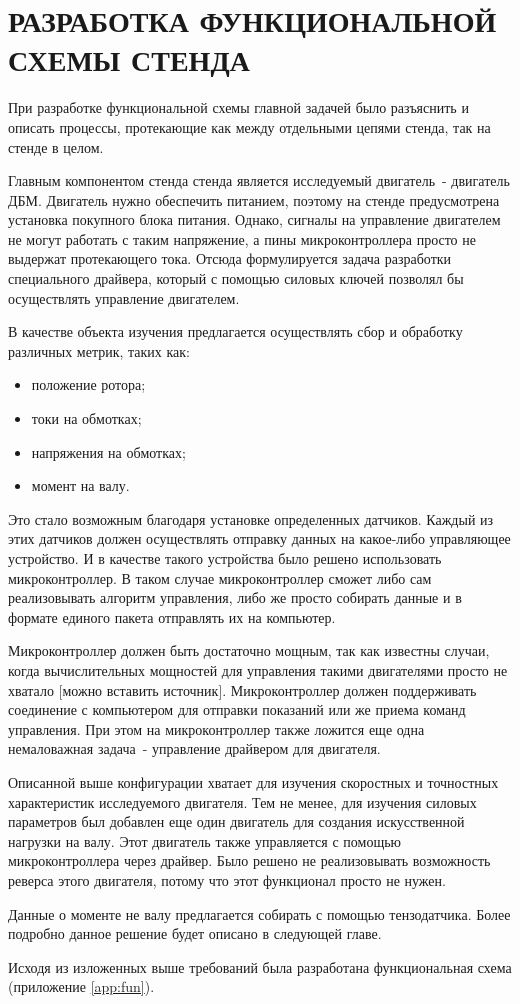 \section{РАЗРАБОТКА ФУНКЦИОНАЛЬНОЙ СХЕМЫ СТЕНДА}

При разработке функциональной схемы главной задачей было разъяснить и описать
процессы, протекающие как между отдельными цепями стенда, так на стенде в целом.

Главным компонентом стенда стенда является исследуемый двигатель~- двигатель ДБМ. Двигатель нужно
обеспечить питанием, поэтому на стенде предусмотрена установка покупного блока питания.
Однако, сигналы на управление двигателем не могут работать с таким напряжение, а
пины микроконтроллера просто не выдержат протекающего тока. Отсюда формулируется
задача разработки специального драйвера, который с помощью силовых ключей позволял бы
осуществлять управление двигателем.

В качестве объекта изучения предлагается осуществлять сбор и обработку различных метрик, таких как:
\begin{itemize}
  \item положение ротора;
  \item токи на обмотках;
  \item напряжения на обмотках;
  \item момент на валу.
\end{itemize}

Это стало возможным благодаря установке определенных датчиков. Каждый из этих датчиков
должен осуществлять отправку данных на какое-либо управляющее устройство. И в качестве такого
устройства было решено использовать микроконтроллер. В таком случае микроконтроллер сможет
либо сам реализовывать алгоритм управления, либо же просто собирать данные и в формате 
единого пакета отправлять их на компьютер.

Микроконтроллер должен быть достаточно мощным, так как известны случаи, когда вычислительных
мощностей для управления такими двигателями просто не хватало [можно вставить источник]. 
Микроконтроллер должен поддерживать соединение с компьютером для отправки показаний или же
приема команд управления.
При этом на микроконтроллер также ложится еще одна немаловажная задача~- управление драйвером
для двигателя.

Описанной выше конфигурации хватает для изучения скоростных и точностных характеристик исследуемого
двигателя. Тем не менее, для изучения силовых параметров был добавлен еще один двигатель
для создания искусственной нагрузки на валу. Этот двигатель также управляется
с помощью микроконтроллера через драйвер. Было решено не реализовывать возможность реверса этого
двигателя, потому что этот функционал просто не нужен. 

Данные о моменте не валу предлагается собирать с помощью тензодатчика. Более подробно
данное решение будет описано в следующей главе.

Исходя из изложенных выше требований была разработана функциональная схема (приложение \ref{app:fun}). 
